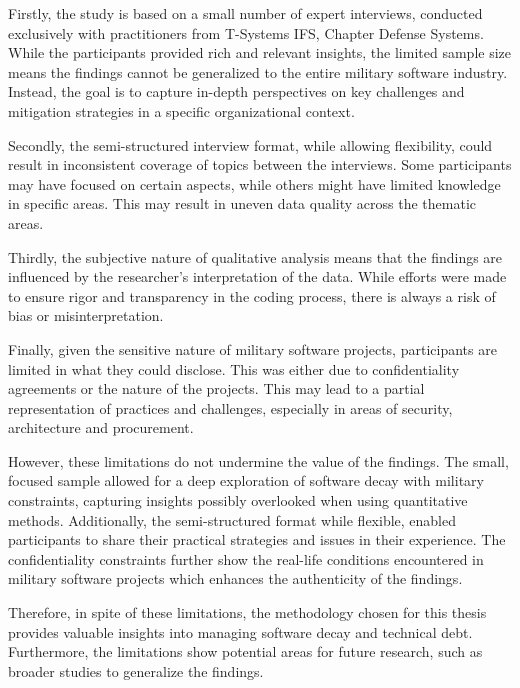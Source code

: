 Firstly, the study is based on a small number of expert interviews, conducted exclusively with practitioners from T-Systems IFS, Chapter Defense Systems. While the participants provided rich and relevant insights, the limited sample size means the findings cannot be generalized to the entire military software industry. 
Instead, the goal is to capture in-depth perspectives on key challenges and mitigation strategies in a specific organizational context.

Secondly, the semi-structured interview format, while allowing flexibility, could result in inconsistent coverage of topics between the interviews. Some participants may have focused on certain aspects, while others might have limited knowledge in specific areas. This may result in uneven data quality across the thematic areas.

Thirdly, the subjective nature of qualitative analysis means that the findings are influenced by the researcher's interpretation of the data. While efforts were made to ensure rigor and transparency in the coding process, there is always a risk of bias or misinterpretation.

Finally, given the sensitive nature of military software projects, participants are limited in what they could disclose. This was either due to confidentiality agreements or the nature of the projects. This may lead to a partial representation of practices and challenges, especially in areas of security, architecture and procurement.

However, these limitations do not undermine the value of the findings. The small, focused sample allowed for a deep exploration of software decay with military constraints, capturing insights possibly overlooked when using quantitative methods. Additionally, the semi-structured format
while flexible, enabled participants to share their practical strategies and issues in their experience. The confidentiality constraints further show the real-life conditions encountered in military software projects which enhances the authenticity of the findings.

Therefore, in spite of these limitations, the methodology chosen for this thesis provides valuable insights into managing software decay and technical debt. Furthermore, the limitations show potential areas for future research, such as broader studies to generalize the findings.

